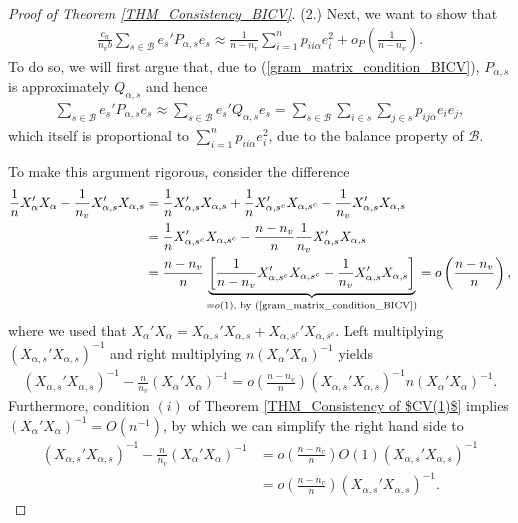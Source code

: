 \documentclass[Research_Module_ES.tex]{subfiles}
\begin{document}
\begin{proof}[Proof of Theorem \ref{THM_Consistency_BICV}]
	(2.) Next, we want to show that
	\begin{align*}
	\frac{c_n}{n_vb}\sum_{s\in\mathcal{B}}e_s'P_{\alpha,s}e_s \approx \frac{1}{n-n_v}\sum_{i=1}^np_{ii\alpha}e_i^2+o_P\left(\frac{1}{n-n_v}\right).
	\end{align*}
	To do so, we will first argue that, due to (\ref{gram_matrix_condition_BICV}), $P_{\alpha,s}$ is approximately $Q_{\alpha,s}$ and hence
	\begin{align*}
	\sum_{s\in\mathcal{B}}e_s'P_{\alpha,s}e_s
	\approx \sum_{s\in\mathcal{B}}e_s'Q_{\alpha,s}e_s
	= \sum_{s\in \mathcal{B}}\sum_{i\in s}\sum_{j\in s}p_{ij\alpha}e_ie_j,
	\end{align*}
	which itself is proportional to $\sum_{i=1}^n p_{ii\alpha}e_i^2$, due to the balance property of $\mathcal{B}$.
	
	To make this argument rigorous, consider the difference
	\begin{align*}
	\frac{1}{n}X_\alpha'X_\alpha - \frac{1}{n_v}X_{\alpha,s}'X_{\alpha,s}
	&=\frac{1}{n}X_{\alpha,s}'X_{\alpha,s} + \frac{1}{n}X_{\alpha,s^c}'X_{\alpha,s^c} - \frac{1}{n_v}X_{\alpha,s}'X_{\alpha,s}\\
	&=\frac{1}{n}X_{\alpha,s^c}'X_{\alpha,s^c} - \frac{n-n_v}{n}\frac{1}{n_v}X_{\alpha,s}'X_{\alpha,s}\\
	&=\frac{n-n_v}{n}\underbrace{\left[\frac{1}{n-n_v}X_{\alpha,s^c}'X_{\alpha,s^c} - \frac{1}{n_v}X_{\alpha,s}'X_{\alpha,s}\right]}_{=o(1)\textrm{, by (\ref{gram_matrix_condition_BICV})}}=o\left(\frac{n-n_v}{n}\right),
	\end{align*}
	where we used that $X_\alpha'X_\alpha =X_{\alpha,s}'X_{\alpha,s}+X_{\alpha,s^c}'X_{\alpha,s^c}$. Left multiplying $(X_{\alpha,s}'X_{\alpha,s})^{-1}$ and right multiplying $n(X_{\alpha}'X_{\alpha})^{-1}$ yields
	\begin{align*}
	(X_{\alpha,s}'X_{\alpha,s})^{-1}-\frac{n}{n_v}(X_{\alpha}'X_{\alpha})^{-1} = o\left(\frac{n-n_v}{n}\right) (X_{\alpha,s}'X_{\alpha,s})^{-1} n (X_{\alpha}'X_{\alpha})^{-1}.
	\end{align*}
	Furthermore, condition $(i)$ of Theorem \ref{THM_Consistency of $CV(1)$} implies $(X_{\alpha}'X_{\alpha})^{-1}=O(n^{-1})$, by which we can simplify the right hand side to
	\begin{align*}
	(X_{\alpha,s}'X_{\alpha,s})^{-1}-\frac{n}{n_v}(X_{\alpha}'X_{\alpha})^{-1} 
	&= o\left(\frac{n-n_v}{n}\right)O(1) (X_{\alpha,s}'X_{\alpha,s})^{-1}\\
	&= o\left(\frac{n-n_v}{n}\right)(X_{\alpha,s}'X_{\alpha,s})^{-1}.
	\end{align*}

\end{proof}
\end{document}
